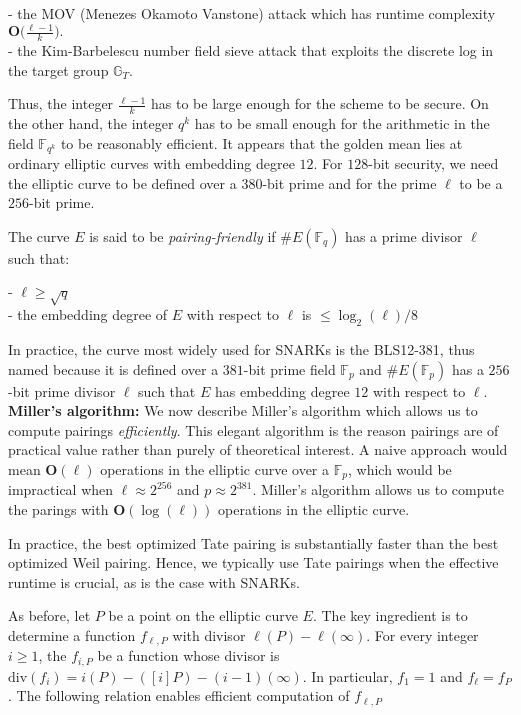 \documentclass[11pt, lettersize, notitlepage, leqno, footskip=0.6cm]{article}
\newcommand{\bF}{\mathbb F}
\newcommand{\bFp}{\mathbb{F}_p}
\newcommand{\bFq}{\mathbb{F}_q}
\newcommand{\bG}{\mathbb{G}}
\newcommand{\divv}{\mathrm{div}}
\newcommand{\mbf}{\mathbf}
\newcommand{\bO}{\mbf{O}}
\newcommand{\noin}{\noindent}
\numberwithin{equation}{section}
\begin{document}
\noin - the MOV (Menezes Okamoto Vanstone) attack which has runtime complexity $\mbf{O}\big(\frac{\ell-1}{k}).$ \\
- the Kim-Barbelescu number field sieve attack that exploits the discrete log in the target group $\bG_T$.

Thus, the integer $\frac{\ell-1}{k}$ has to be large enough for the scheme to be secure. On the other hand, the integer $q^k$ has to be small enough for the arithmetic in the field $\bF _{q^k}$ to be reasonably efficient. It appears that the golden mean  lies at ordinary elliptic curves with embedding degree $12$. For $128$-bit security, we need the elliptic curve to be defined over a $380$-bit prime and for the prime $\ell$ to be a $256$-bit prime.  

The curve $E$ is said to be \textit{pairing-friendly} if $\# E(\bFq)$ has a prime divisor $\ell$ such that:

\noin - $\ell\geq \sqrt{q}$\\
- the embedding degree of $E$ with respect to $\ell$ is  $\leq \log_2(\ell)/8$

In practice, the curve most widely used for SNARKs is the BLS12-381, thus named because it is defined over a $381$-bit prime field $\bFp$ and $\# E(\bFp)$ has a $256$-bit prime divisor $\ell$ such that $E$ has embedding degree $12$ with respect to $\ell$.\\ 




\noin \textbf{Miller's algorithm:} We now describe Miller's algorithm which allows us to compute pairings \textit{efficiently}. This elegant algorithm is the reason pairings are of practical value rather than purely of theoretical interest. A naive approach would mean $\bO(\ell)$ operations in the elliptic curve over a $\bFp$, which would be impractical when $\ell \approx 2^{256}$ and $p\approx 2^{381}$. Miller's algorithm allows us to compute the parings with $\bO(\log(\ell))$  operations in the elliptic curve.

In practice, the best optimized Tate pairing is substantially faster than the best optimized Weil pairing. Hence, we typically use Tate pairings when the     effective runtime is crucial, as is the case with SNARKs.

As before, let $P$ be a point on the elliptic curve $E$. The key ingredient is to determine a function $f_{\ell,P}$ with divisor $\ell(P)-\ell(\infty)$. For every integer $i\geq 1$, the $f_{i,P}$ be a function whose divisor is $\divv(f_i) = i(P)	- ([i]P) - (i-1)(\infty)$. In particular, $f_1 = 1$ and $f_{\ell} = f_{P}$. The following relation enables efficient computation of $f_{\ell,P}$
\end{document}
